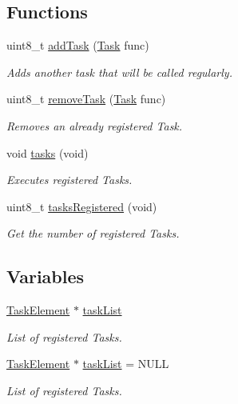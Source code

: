 \subsection*{Functions}
\begin{DoxyCompactItemize}
\item 
uint8\-\_\-t \hyperlink{group__task_ga9a6ba4cb66e2fb7e3be42fb5b87fec6f}{add\-Task} (\hyperlink{group__task_gaa9c5b8d3ac838189ed335dbe4ec9fa6b}{Task} func)
\begin{DoxyCompactList}\small\item\em Adds another task that will be called regularly. \end{DoxyCompactList}\item 
uint8\-\_\-t \hyperlink{group__task_ga2651e32a00e6db5b77aa1042d3c7b9c7}{remove\-Task} (\hyperlink{group__task_gaa9c5b8d3ac838189ed335dbe4ec9fa6b}{Task} func)
\begin{DoxyCompactList}\small\item\em Removes an already registered Task. \end{DoxyCompactList}\item 
void \hyperlink{group__task_gabf4510e1aba7b08f11d447c2b530d661}{tasks} (void)
\begin{DoxyCompactList}\small\item\em Executes registered Tasks. \end{DoxyCompactList}\item 
uint8\-\_\-t \hyperlink{group__task_ga962f40b16f7aa5ab995593971fb6f848}{tasks\-Registered} (void)
\begin{DoxyCompactList}\small\item\em Get the number of registered Tasks. \end{DoxyCompactList}\end{DoxyCompactItemize}
\subsection*{Variables}
\begin{DoxyCompactItemize}
\item 
\hyperlink{struct_task_element}{Task\-Element} $\ast$ \hyperlink{group__task_gaadf0c3981f1a6c7cc610de145a1d5461}{task\-List}
\begin{DoxyCompactList}\small\item\em List of registered Tasks. \end{DoxyCompactList}\item 
\hyperlink{struct_task_element}{Task\-Element} $\ast$ \hyperlink{group__task_gaadf0c3981f1a6c7cc610de145a1d5461}{task\-List} = N\-U\-L\-L
\begin{DoxyCompactList}\small\item\em List of registered Tasks. \end{DoxyCompactList}\end{DoxyCompactItemize}


